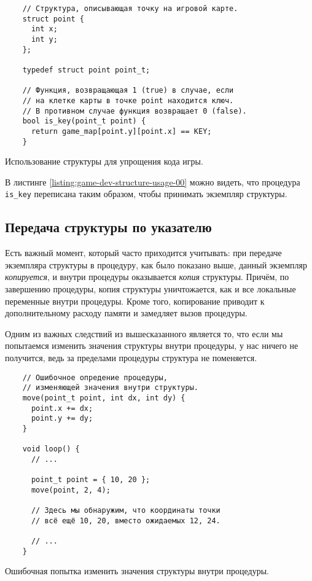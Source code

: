 \documentclass[../sparc.tex]{subfiles}
\begin{document}
\begin{listing}[H]
  \begin{verbatim}
    // Структура, описывающая точку на игровой карте.
    struct point {
      int x;
      int y;
    };

    typedef struct point point_t;

    // Функция, возвращающая 1 (true) в случае, если
    // на клетке карты в точке point находится ключ.
    // В противном случае функция возвращает 0 (false).
    bool is_key(point_t point) {
      return game_map[point.y][point.x] == KEY;
    }
  \end{verbatim}
  \caption{Использование структуры для упрощения кода игры.}
  \label{listing:game-dev-structure-usage-00}
\end{listing}

В листинге \ref{listing:game-dev-structure-usage-00} можно видеть, что процедура
\texttt{is\_key} переписана таким образом, чтобы принимать экземпляр структуры.

\subsection{Передача структуры по указателю}

Есть важный момент, который часто приходится учитывать: при передаче экземпляра
структуры в процедуру, как было показано выше, данный экземпляр
\emph{копируется}, и внутри процедуры оказывается \emph{копия} структуры.
Причём, по завершению процедуры, копия структуры уничтожается, как и все
локальные переменные внутри процедуры.  Кроме того, копирование приводит к
дополнительному расходу памяти и замедляет вызов процедуры.

Одним из важных следствий из вышесказанного является то, что если мы попытаемся
изменить значения структуры внутри процедуры, у нас ничего не получится, ведь за
пределами процедуры структура не поменяется.

\begin{listing}[H]
  \begin{verbatim}
    // Ошибочное опредение процедуры,
    // изменяющей значения внутри структуры.
    move(point_t point, int dx, int dy) {
      point.x += dx;
      point.y += dy;
    }

    void loop() {
      // ...

      point_t point = { 10, 20 };
      move(point, 2, 4);

      // Здесь мы обнаружим, что координаты точки
      // всё ещё 10, 20, вместо ожидаемых 12, 24.

      // ...
    }
  \end{verbatim}
  \caption{Ошибочная попытка изменить значения структуры внутри процедуры.}
  \label{listing:game-dev-structure-usage-01}
\end{listing}
\end{document}
